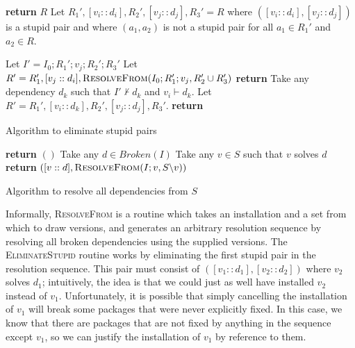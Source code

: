 \documentclass[letterpaper]{article}
\theoremstyle{definition}
\theoremstyle{remark}
\newcommand{\act}[2]{[#1 :: #2]}
\newcommand{\satisfies}{\vdash}
\begin{document}
\begin{algorithm}[p]
\begin{algorithmic}[1]
    \State \textbf{return} $R$
  \Else
    \State Let $R_1',\act{v_i}{d_i},R_2',\act{v_j}{d_j},R_3' = R$
           where $\left(\act{v_i}{d_i},\act{v_j}{d_j}\right)$ is
           a stupid pair and where $(a_1,a_2)$ is not a stupid pair for
           all $a_1 \in R_1'$ and $a_2 \in R$. \label{line:unpack-stupid-pair}

    \State Let $I' = I_0;R_1';v_j;R_2';R_3'$
      \State Let $R' = R_1',\act{v_j}{d_i},\Call{ResolveFrom}{I_0;R_1';v_j,R_2' \cup R_3'}$
      \State \textbf{return}  \label{line:eliminate-stupid-recur-1}
    \Else
      \State Take any dependency $d_k$ such that $I' \not \satisfies d_k$ and $v_i \satisfies d_k$.
      \State Let $R' = R_1',\act{v_i}{d_k},R_2',\act{v_j}{d_j},R_3'$.
      \State \textbf{return}  \label{line:eliminate-stupid-recur-2}
    \EndIf
  \EndIf
\EndProcedure
\end{algorithmic}
\label{alg:eliminate-stupid}
\caption{Algorithm to eliminate stupid pairs}
\end{algorithm}

\begin{algorithm}[p]
\begin{algorithmic}[1]
    \State \textbf{return} $()$
  \Else
    \State Take any $d \in Broken(I)$ \label{line:resolve-from-take-broken}
    \State Take any $v \in S$ such that $v$ solves $d$ \label{line:resolve-from-take-solver}
    \State \textbf{return} $\left(\act{v}{d}, \Call{ResolveFrom}{I;v, S \backslash v}\right)$ \label{line:resolve-from-recur}
  \EndIf
\EndProcedure
\end{algorithmic}
\caption{Algorithm to resolve all dependencies from $S$}
\label{alg:resolve-from}
\end{algorithm}

Informally, \textsc{ResolveFrom} is a routine which takes an
installation and a set from which to draw versions, and generates an
arbitrary resolution sequence by resolving all broken dependencies
using the supplied versions.  The \textsc{EliminateStupid} routine
works by eliminating the first stupid pair in the resolution sequence.
This pair must consist of $\left(\act{v_1}{d_1},\act{v_2}{d_2}\right)$
where $v_2$ solves $d_1$; intuitively, the idea is that we could just
as well have installed $v_2$ instead of $v_1$.  Unfortunately, it is
possible that simply cancelling the installation of $v_1$ will break
some packages that were never explicitly fixed.  In this case, we know
that there are packages that are not fixed by anything in the sequence
except $v_1$, so we can justify the installation of $v_1$ by reference
to them.
\end{document}
